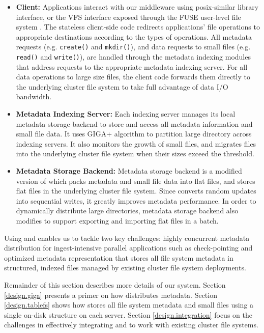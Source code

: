 \begin{itemize}
\item{\textbf{Client:}} Applications interact with our middleware
using posix-similar library interface, or the VFS interface exposed
through the FUSE user-level file system \cite{fuse}.
The stateless client-side code redirects applications' file operations
to appropriate destinations according to the types of operations.
All metadata requests (e.g. \texttt{create()} and \texttt{mkdir()}),
and data requests to small files (e.g. \texttt{read()} and \texttt{write()}),
are handled through the metadata indexing modules that address
requests to the appropriate metadata indexing server.
For all data operations to large size files, the client code forwards
them directly to the underlying cluster file system to take full
advantage of data I/O bandwidth.

\item{\textbf{Metadata Indexing Server:}}
Each indexing server manages its local metadata storage backend to store and
access all metadata information and small file data. It uses GIGA+ algorithm to
partition large directory across indexing servers. It also monitors the growth
of small files, and migrates files into the underlying cluster file system
when their sizes exceed the threshold.

\item{\textbf{Metadata Storage Backend:}}
Metadata storage backend is a modified version of \tfs which packs metadata and
small file data into flat files, and stores flat files
in the underlying cluster file system. Since \tfs converts random updates into
sequential writes, it greatly improves metadata performance. In order to
dynamically distribute large directories, metadata storage backend also modifies
\tfs to support exporting and importing flat files in a batch.

\end{itemize}


Using \giga and \tfs enables us to tackle two key challenges: highly
concurrent metadata distribution for ingest-intensive parallel applications
such as check-pointing \cite{PLFS} and
optimized metadata representation that stores all file system
metadata in structured, indexed files managed by existing cluster file system
deployments.

Remainder of this section describes more details of our system.
Section \ref{design.giga} presents a primer on how \giga distributes metadata.
Section \ref{design.tablefs} shows how \tfs stores all file system metadata
and small files using a single on-disk structure on each server.
Section \ref{design.integration} focus on the challenges in effectively
integrating \giga and \tfs to work with existing cluster file systems.


